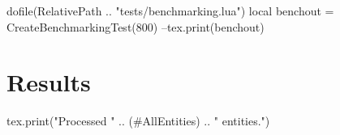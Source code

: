 \documentclass[oneside]{memoir}
\begin{document}
\pagestyle{empty}

\begin{luacode*}
	dofile(RelativePath .. "tests/benchmarking.lua")
	local benchout = CreateBenchmarkingTest(800)
	--tex.print(benchout)
\end{luacode*}

\chapter*{Results}

\begin{luacode*}
	tex.print("Processed " .. (#AllEntities) .. " entities.")
\end{luacode*}

\PrintRpgTexErrors

\PrintRpgTexBenchmarking
\end{document}
